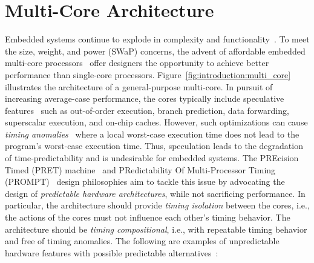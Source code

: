 \section{Multi-Core Architecture}
\label{sec:architecture_multicore}
Embedded systems continue to explode in
complexity and functionality~\cite{sld_complexity}. To meet
the size, weight, and power (SWaP) concerns, the advent of
affordable embedded multi-core
processors~\cite{multithreading_multicore,multithreading_multicore_parallelism} 
offer designers the opportunity to achieve better performance 
than single-core processors.
Figure~\ref{fig:introduction:multi_core} illustrates the
architecture of a general-purpose multi-core. In pursuit of
increasing average-case performance, the cores typically
include speculative 
features~\cite{multithreading_cpu_overview} such as
out-of-order execution, branch prediction, data forwarding,
superscalar execution, and 
on-chip caches. However, such optimizations can cause
\emph{timing anomalies}~\cite{LundqvistS99} where a local
worst-case execution time does not lead to the program's
worst-case execution time. Thus, speculation leads to the
degradation of time-predictability and is undesirable for embedded systems.
The PREcision Timed (PRET) machine~\cite{pret_pret,pret_repeatable_timing} and
PRedictability Of Multi-Processor Timing
(PROMPT)~\cite{multithreading_designing_predictable_considerations,KastnerSPCGHF12} 
design philosophies aim to tackle this issue by advocating the
design of \emph{predictable hardware architectures}, while
not sacrificing performance. In particular, the architecture
should provide \emph{timing isolation} between the cores,
i.e., the actions of the cores must not influence each
other's timing behavior. The architecture should be
\emph{timing compositional}, i.e., with repeatable timing behavior
and free of timing anomalies. The following are examples
of unpredictable hardware features with possible predictable
alternatives~\cite{wcet_future_architectures,multithreading_designing_automotive,multithreading_predictable_multiprocessor}:
